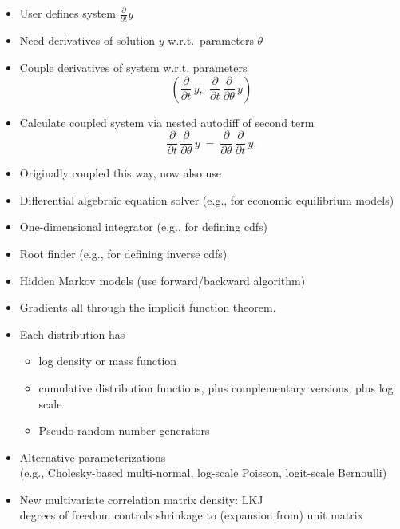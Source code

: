 \documentclass[10pt]{report}
\begin{document}
%
\begin{itemize}
\item User defines system $\frac{\partial}{\partial t} y$
\item Need derivatives of solution $y$ w.r.t.\ parameters $\theta$
\item Couple derivatives of system  w.r.t. parameters
\[
\left(
\frac{\partial}{\partial t} \, y, \ \
\frac{\partial}{\partial t} \, \frac{\partial}{\partial \theta} \, y
\right)
\]
\item Calculate coupled system via nested autodiff of second term
\[
\frac{\partial}{\partial t} \, \frac{\partial}{\partial \theta} \, y
\ = \
\frac{\partial}{\partial \theta} \, \frac{\partial}{\partial t} \, y.
\]
\item Originally coupled this way, now also use 
\end{itemize}

\begin{itemize}
\item Differential algebraic equation solver (e.g., for economic equilibrium models)
\item One-dimensional integrator (e.g., for defining cdfs)
\item Root finder (e.g., for defining inverse cdfs) 
\item Hidden Markov models (use forward/backward algorithm)
  \vfill
\item Gradients all through the implicit function theorem.
\end{itemize}

%
\begin{itemize}
\item Each distribution has
  \vspace*{-4pt}
  \begin{itemize}\small
  \item log density or mass function
  \item cumulative distribution functions, plus complementary versions,
    plus log scale
  \item Pseudo-random number generators
  \end{itemize}
\item Alternative parameterizations
  \\
  {\footnotesize (e.g., Cholesky-based multi-normal,
    log-scale Poisson, logit-scale Bernoulli)}
\item New multivariate correlation matrix density: LKJ
  \\
  {\footnotesize degrees of freedom controls
    shrinkage to (expansion from) unit matrix}
\end{itemize}
\end{document}
